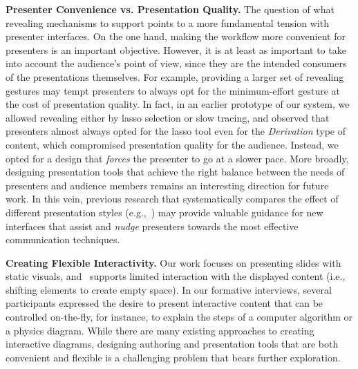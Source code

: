 \textbf{Presenter Convenience vs. Presentation Quality.} The question of what revealing mechanisms to support points to a more fundamental tension with presenter interfaces. 
%
On the one hand, making the workflow more convenient for presenters is an important objective. However, it is at least as important to take into account the audience's point of view, since they are the intended consumers of the presentations themselves.
%
For example, providing a larger set of revealing gestures may tempt presenters to always opt for the minimum-effort gesture at the cost of presentation quality. In fact, in an earlier prototype of our system, we allowed revealing either by lasso selection or slow tracing, and observed that presenters almost always opted for the lasso tool even for the \textit{Derivation} type of content, which compromised presentation quality for the audience. Instead, we opted for a design that \textit{forces} the presenter to go at a slower pace.
%
More broadly, designing presentation tools that achieve the right balance between the needs of presenters and audience members remains an interesting direction for future work. In this vein, previous research that systematically compares the effect of different presentation styles (e.g.,~\cite{seth2010powerpoint, cross2013typerighting}) may provide valuable guidance for new interfaces that assist and \textit{nudge} presenters towards the most effective communication techniques.

\textbf{Creating Flexible Interactivity.} Our work focuses on presenting slides with static visuals, and \interface\ supports limited interaction with the displayed content (i.e., shifting elements to create empty space). In our formative interviews, several participants expressed the desire to present interactive content that can be controlled on-the-fly, for instance, to explain the steps of a computer algorithm or a physics diagram. 
%
While there are many existing approaches to creating interactive diagrams, designing authoring and presentation tools that are both convenient and flexible is a challenging problem that bears further exploration.




